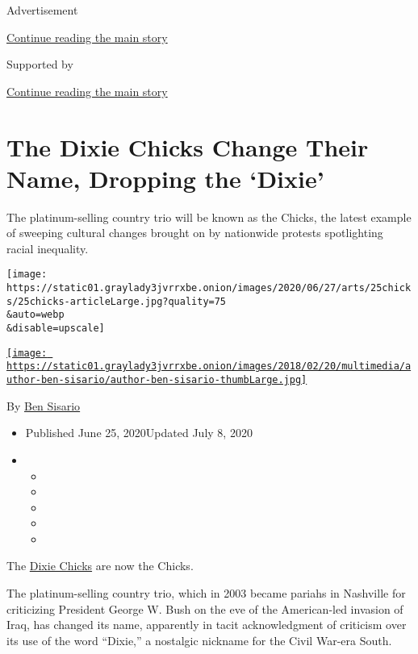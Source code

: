 Advertisement

\protect\hyperlink{after-top}{Continue reading the main story}

Supported by

\protect\hyperlink{after-sponsor}{Continue reading the main story}

\hypertarget{the-dixie-chicks-change-their-name-dropping-the-dixie}{%
\section{The Dixie Chicks Change Their Name, Dropping the
`Dixie'}\label{the-dixie-chicks-change-their-name-dropping-the-dixie}}

The platinum-selling country trio will be known as the Chicks, the
latest example of sweeping cultural changes brought on by nationwide
protests spotlighting racial inequality.

\texttt{[image: https://static01.graylady3jvrrxbe.onion/images/2020/06/27/arts/25chicks/25chicks-articleLarge.jpg?quality=75\\\&auto=webp\\\&disable=upscale]}

\href{https://www.nytimes3xbfgragh.onion/by/ben-sisario}{\texttt{[image: https://static01.graylady3jvrrxbe.onion/images/2018/02/20/multimedia/author-ben-sisario/author-ben-sisario-thumbLarge.jpg]}}

By \href{https://www.nytimes3xbfgragh.onion/by/ben-sisario}{Ben Sisario}

\begin{itemize}
\item
  Published June 25, 2020Updated July 8, 2020
\item
  \begin{itemize}
  \item
  \item
  \item
  \item
  \item
  \end{itemize}
\end{itemize}

The
\href{https://www.nytimes3xbfgragh.onion/2020/07/08/arts/music/dixie-chicks-gaslighter.html}{Dixie
Chicks} are now the Chicks.

The platinum-selling country trio, which in 2003 became pariahs in
Nashville for criticizing President George W. Bush on the eve of the
American-led invasion of Iraq, has changed its name, apparently in tacit
acknowledgment of criticism over its use of the word ``Dixie,'' a
nostalgic nickname for the Civil War-era South.

